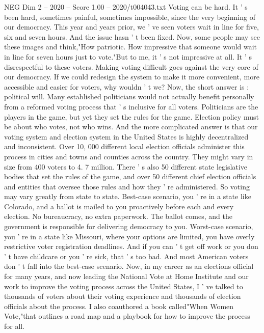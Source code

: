 \begin{textsample}{NEG Dim 2 – 2020 – Score 1.00 – 2020/t004043.txt}  \label{ex:f2_neg_079}
Voting can be hard.
It ' s been hard, sometimes painful, sometimes impossible, since the very beginning of our democracy.
This year and years prior, we ' ve seen voters wait in line for five, six and seven hours.
And the issue hasn ' t been fixed.
Now, some people may see these images and think,"How patriotic.
How impressive that someone would wait in line for seven hours just to vote."But to me, it ' s not impressive at all.
It ' s disrespectful to these voters.
Making voting difficult goes against the very core of our democracy.
If we could redesign the system to make it more convenient, more accessible and easier for voters, why wouldn ' t we?
Now, the short answer is : political will.
Many established politicians would not actually benefit personally from a reformed voting process that ' s inclusive for all voters.
Politicians are the players in the game, but yet they set the rules for the game.
Election policy must be about who votes, not who wins.
And the more complicated answer is that our voting system and election system in the United States is highly decentralized and inconsistent.
Over 10, 000 different local election officials administer this process in cities and towns and counties across the country.
They might vary in size from 400 voters to 4. 7 million.
There ' s also 50 different state legislative bodies that set the rules of the game, and over 50 different chief election officials and entities that oversee those rules and how they ' re administered.
So voting may vary greatly from state to state.
Best-case scenario, you ' re in a state like Colorado, and a ballot is mailed to you proactively before each and every election.
No bureaucracy, no extra paperwork.
The ballot comes, and the government is responsible for delivering democracy to you.
Worst-case scenario, you ' re in a state like Missouri, where your options are limited, you have overly restrictive voter registration deadlines.
And if you can ' t get off work or you don ' t have childcare or you ' re sick, that ' s too bad.
And most American voters don ' t fall into the best-case scenario.
Now, in my career as an elections official for many years, and now leading the National Vote at Home Institute and our work to improve the voting process across the United States, I ' ve talked to thousands of voters about their voting experience and thousands of election officials about the process.
I also coauthored a book called"When Women Vote,"that outlines a road map and a playbook for how to improve the process for all.

\end{textsample}
